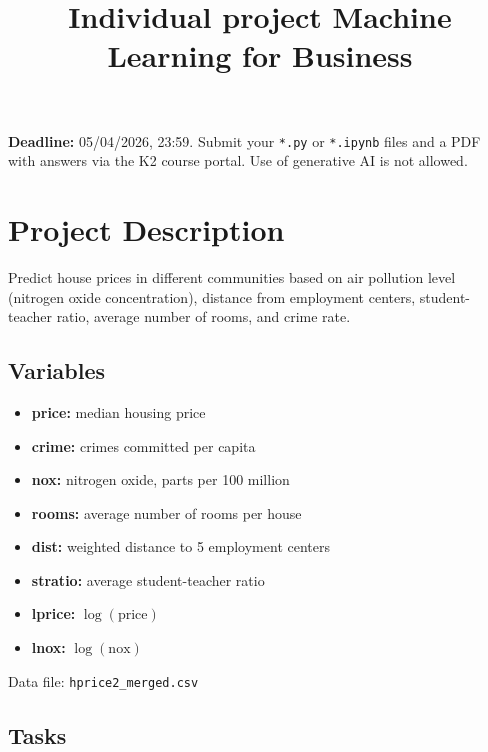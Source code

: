 \documentclass{article}
\title{Individual project Machine Learning for Business}
\author{}
\date{}
\begin{document}
\maketitle

\textbf{Deadline:} 05/04/2026, 23:59. Submit your \texttt{*.py} or \texttt{*.ipynb} files and a PDF with answers via the K2 course portal. Use of generative AI is not allowed.

\section*{Project Description}

Predict house prices in different communities based on air pollution level (nitrogen oxide concentration), distance from employment centers, student-teacher ratio, average number of rooms, and crime rate.

\subsection*{Variables}
\begin{itemize}
  \item \textbf{price:} median housing price
  \item \textbf{crime:} crimes committed per capita
  \item \textbf{nox:} nitrogen oxide, parts per 100 million
  \item \textbf{rooms:} average number of rooms per house
  \item \textbf{dist:} weighted distance to 5 employment centers
  \item \textbf{stratio:} average student-teacher ratio
  \item \textbf{lprice:} $\log(\text{price})$
  \item \textbf{lnox:} $\log(\text{nox})$
\end{itemize}

Data file: \lstinline|hprice2_merged.csv|

\subsection*{Tasks}
\end{document}
